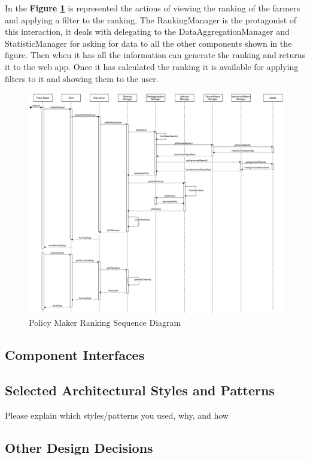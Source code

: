 \begin{flushleft}
In the  \textbf{Figure \ref{fig:policyMakerRankingSequenceDiagram}} is represented the actions of viewing the ranking of the farmers and applying a filter to the ranking. The RankingManager is the protagonist of this interaction, it deals with delegating to the DataAggregationManager and StatisticManager for asking for data to all the other components shown in the figure. Then when it has all the information can generate the ranking and returns it to the web app.
Once it has calculated the ranking it is available for applying filters to it and showing them to the user. 

\end{flushleft}

\begin{figure}[hbt!]
\centering
\includegraphics[width=\textwidth]{../images_diagrams/dd/policyMakerSequenceDiaEXT.drawio.png}
\caption{Policy Maker Ranking Sequence Diagram}
\label{fig:policyMakerRankingSequenceDiagram}
\end{figure}

\subsection{Component Interfaces}
\subsection{Selected Architectural Styles and Patterns}
Please explain which styles/patterns you used, why, and how
\subsection{Other Design Decisions}